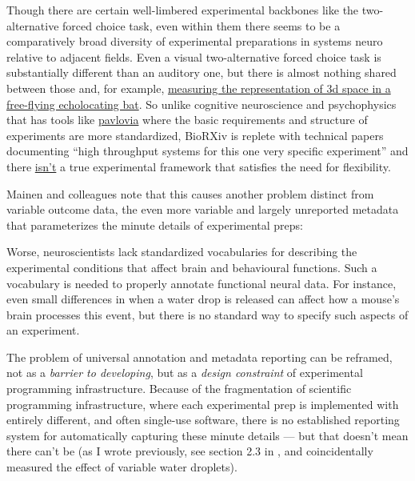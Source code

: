 \documentclass[10pt]{article}
\begin{document}
\begin{multicols}{2}
Though there are certain well-limbered experimental backbones like the
two-alternative forced choice task, even within them there seems to be a
comparatively broad diversity of experimental preparations in systems
neuro relative to adjacent fields. Even a visual two-alternative forced
choice task is substantially different than an auditory one, but there
is almost nothing shared between those and, for example,
\href{https://doi.org/10.7554/eLife.29053}{measuring the representation
of 3d space in a free-flying echolocating bat}. So unlike cognitive
neuroscience and psychophysics that has tools like
\href{https://pavlovia.org/}{pavlovia} where the basic requirements and
structure of experiments are more standardized, BioRXiv is replete with
technical papers documenting ``high throughput systems for this one very
specific experiment'' and there
\href{https://docs.auto-pi-lot.com}{isn't} a true experimental framework
that satisfies the need for flexibility.

Mainen and colleagues note that this causes another problem distinct
from variable outcome data, the even more variable and largely
unreported metadata that parameterizes the minute details of
experimental preps:

\begin{leftbar}
Worse, neuroscientists lack standardized vocabularies for describing the
experimental conditions that affect brain and behavioural functions.
Such a vocabulary is needed to properly annotate functional neural data.
For instance, even small differences in when a water drop is released
can affect how a mouse's brain processes this event, but there is no
standard way to specify such aspects of an experiment. \cite{mainenBetterWayCrack2016} 
\end{leftbar}

The problem of universal annotation and metadata reporting can be
reframed, not as a \emph{barrier to developing}, but as a \emph{design
constraint} of experimental programming infrastructure. Because of the
fragmentation of scientific programming infrastructure, where each
experimental prep is implemented with entirely different, and often
single-use software, there is no established reporting system for
automatically capturing these minute details --- but that doesn't mean
there can't be (as I wrote previously, see section 2.3 in \cite{saundersAutopilotAutomatingBehavioral2019} , and coincidentally
measured the effect of variable water droplets).

\hypertarget{the-hacker-spirit-and-celebration-of-heroism}{%
}
\end{multicols}
\end{document}
